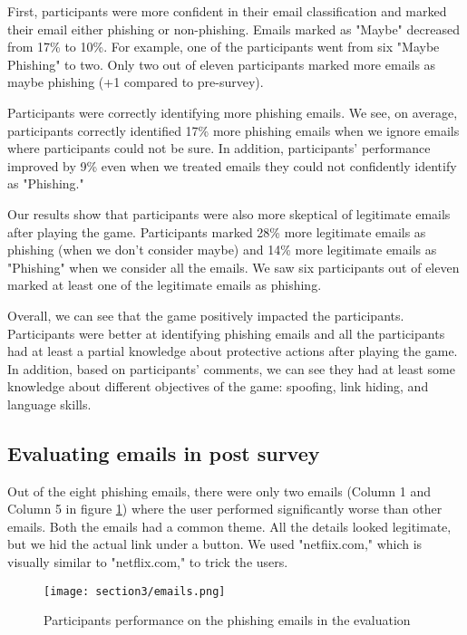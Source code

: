 First, participants were more confident in their email classification and marked their email either phishing or non-phishing. Emails marked as "Maybe" decreased from 17\% to 10\%. For example, one of the participants went from six "Maybe Phishing" to two. Only two out of eleven participants marked more emails as maybe phishing (+1 compared to pre-survey).

Participants were correctly identifying more phishing emails. We see, on average, participants correctly identified 17\% more phishing emails when we ignore emails where participants could not be sure. In addition, participants' performance improved by 9\% even when we treated emails they could not confidently identify as "Phishing."

Our results show that participants were also more skeptical of legitimate emails after playing the game. Participants marked 28\% more legitimate emails as phishing (when we don't consider maybe) and 14\% more legitimate emails as "Phishing" when we consider all the emails. We saw six participants out of eleven marked at least one of the legitimate emails as phishing.

Overall, we can see that the game positively impacted the participants. Participants were better at identifying phishing emails and all the participants had at least a partial knowledge about protective actions after playing the game. In addition, based on participants' comments, we can see they had at least some knowledge about different objectives of the game: spoofing, link hiding, and language skills.

\subsection{Evaluating emails in post survey}
Out of the eight phishing emails, there were only two emails (Column 1 and Column 5 in figure \ref{fig:emails}) where the user performed significantly worse than other emails. Both the emails had a common theme. All the details looked legitimate, but we hid the actual link under a button. We used "netfiix.com," which is visually similar to "netflix.com," to trick the users.

\begin{figure}[!ht]
    \begin{center}
        \texttt{[image: section3/emails.png]}
        \caption{Participants performance on the phishing emails in the evaluation}
        \label{fig:emails}
    \end{center}
\end{figure}

